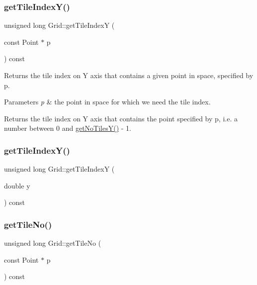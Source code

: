 \mbox{\label{class_grid_ae1eeb3b42007ae1cf19cfaf0d846fb9a}} 
\subsubsection{\texorpdfstring{get\+Tile\+Index\+Y()}{getTileIndexY()}\hspace{0.1cm}{\footnotesize\ttfamily [1/2]}}
{\footnotesize\ttfamily unsigned long Grid\+::get\+Tile\+IndexY (\begin{DoxyParamCaption}\item[{const Point $\ast$}]{p }\end{DoxyParamCaption}) const}

Returns the tile index on Y axis that contains a given point in space, specified by p. 
\begin{DoxyParams}{Parameters}
{\em p} & the point in space for which we need the tile index. \\
\hline
\end{DoxyParams}
\begin{DoxyReturn}{Returns}
the tile index on Y axis that contains the point specified by p, i.\+e. a number between 0 and \hyperlink{class_grid_a783a3153d03154cfd33e6a418bb8d390}{get\+No\+Tiles\+Y()} -\/ 1. 
\end{DoxyReturn}
\mbox{\label{class_grid_ad745f856bb2b27382118ac03fafc06b4}} 
\subsubsection{\texorpdfstring{get\+Tile\+Index\+Y()}{getTileIndexY()}\hspace{0.1cm}{\footnotesize\ttfamily [2/2]}}
{\footnotesize\ttfamily unsigned long Grid\+::get\+Tile\+IndexY (\begin{DoxyParamCaption}\item[{double}]{y }\end{DoxyParamCaption}) const}

\mbox{\label{class_grid_a93e42713b7af1f188ce90f92a5e202ab}} 
\subsubsection{\texorpdfstring{get\+Tile\+No()}{getTileNo()}\hspace{0.1cm}{\footnotesize\ttfamily [1/2]}}
{\footnotesize\ttfamily unsigned long Grid\+::get\+Tile\+No (\begin{DoxyParamCaption}\item[{const Point $\ast$}]{p }\end{DoxyParamCaption}) const}


